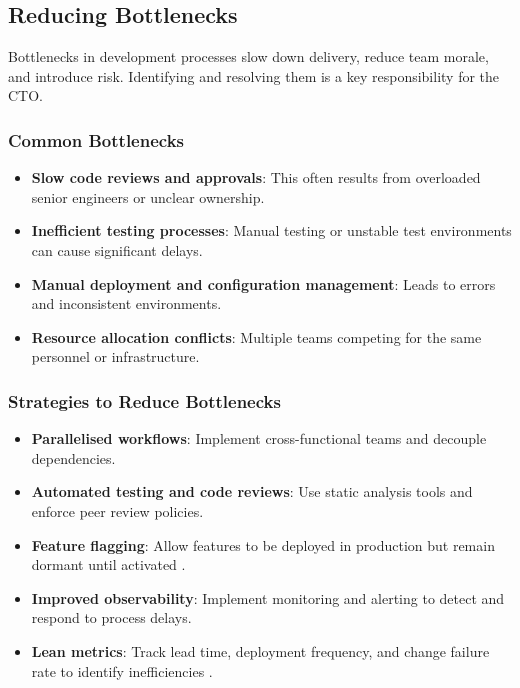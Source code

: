 \subsection{Reducing Bottlenecks}
Bottlenecks in development processes slow down delivery, reduce team morale, and introduce risk. Identifying and resolving them is a key responsibility for the CTO.

\subsubsection*{Common Bottlenecks}
\begin{itemize}
    \item \textbf{Slow code reviews and approvals}: This often results from overloaded senior engineers or unclear ownership.
    \item \textbf{Inefficient testing processes}: Manual testing or unstable test environments can cause significant delays.
    \item \textbf{Manual deployment and configuration management}: Leads to errors and inconsistent environments.
    \item \textbf{Resource allocation conflicts}: Multiple teams competing for the same personnel or infrastructure.
\end{itemize}

\subsubsection*{Strategies to Reduce Bottlenecks}
\begin{itemize}
    \item \textbf{Parallelised workflows}: Implement cross-functional teams and decouple dependencies.
    \item \textbf{Automated testing and code reviews}: Use static analysis tools and enforce peer review policies.
    \item \textbf{Feature flagging}: Allow features to be deployed in production but remain dormant until activated \cite{rahman2020feature}.
    \item \textbf{Improved observability}: Implement monitoring and alerting to detect and respond to process delays.
    \item \textbf{Lean metrics}: Track lead time, deployment frequency, and change failure rate to identify inefficiencies \cite{forsgren2018accelerate}.
\end{itemize}

